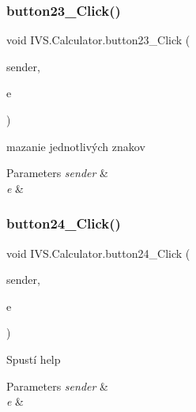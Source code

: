 \subsubsection{\texorpdfstring{button23\+\_\+\+Click()}{button23\_Click()}}
{\footnotesize\ttfamily void I\+V\+S.\+Calculator.\+button23\+\_\+\+Click (\begin{DoxyParamCaption}\item[{object}]{sender,  }\item[{Event\+Args}]{e }\end{DoxyParamCaption})\hspace{0.3cm}{\ttfamily [protected]}}



mazanie jednotlivých znakov 


\begin{DoxyParams}{Parameters}
{\em sender} & \\
\hline
{\em e} & \\
\hline
\end{DoxyParams}
\mbox{\label{class_i_v_s_1_1_calculator_a35aa433b5f36197331eecc260dc495f3}} 
\subsubsection{\texorpdfstring{button24\+\_\+\+Click()}{button24\_Click()}}
{\footnotesize\ttfamily void I\+V\+S.\+Calculator.\+button24\+\_\+\+Click (\begin{DoxyParamCaption}\item[{object}]{sender,  }\item[{Event\+Args}]{e }\end{DoxyParamCaption})\hspace{0.3cm}{\ttfamily [protected]}}



Spustí help 


\begin{DoxyParams}{Parameters}
{\em sender} & \\
\hline
{\em e} & \\
\hline
\end{DoxyParams}
\mbox{\label{class_i_v_s_1_1_calculator_a59df8db86ef51c3c105143abd36ae3da}} 
